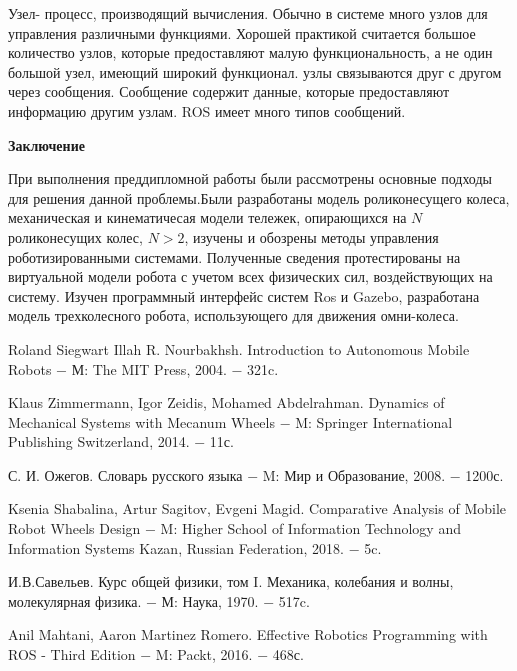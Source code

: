 \documentclass[oneside,final,14pt]{extreport}
\begin{document}
 Узел- процесс, производящий вычисления. Обычно в системе много узлов для управления различными функциями. Хорошей практикой считается большое количество узлов, которые предоставляют малую функциональность, а не один большой узел, имеющий широкий функционал. узлы связываются друг с другом через сообщения. Сообщение содержит данные, которые предоставляют информацию другим узлам. ROS имеет много типов сообщений.


\newpage
\begin{center}
\bfseries Заключение
\end{center}

При выполнения преддипломной работы были рассмотрены основные подходы для решения данной проблемы.Были разработаны модель роликонесущего колеса, механическая и кинематичесая модели тележек, опирающихся на $N$ роликонесущих колес, $N>2$, изучены и обозрены методы управления роботизированными системами. Полученные сведения протестированы на виртуальной модели робота с учетом всех физических сил, воздействующих на систему. Изучен программный интерфейс систем Ros и Gazebo, разработана модель трехколесного робота, использующего для движения омни-колеса.

\newpage
\begin{thebibliography}{0}

Roland Siegwart
Illah R. Nourbakhsh.
Introduction to Autonomous Mobile Robots
$-$ М: The MIT Press, 2004. $-$ 321c.

Klaus Zimmermann, Igor Zeidis, Mohamed Abdelrahman.
Dynamics of Mechanical Systems
with Mecanum Wheels
$-$ M:  Springer International Publishing Switzerland, 2014. $-$ 11с.

С. И. Ожегов.
Словарь русского языка
$-$ M: Мир и Образование, 2008. $-$ 1200с.


Ksenia Shabalina, Artur Sagitov, Evgeni Magid.
Comparative Analysis of Mobile Robot Wheels
Design
$-$ M: Higher School of Information Technology and Information Systems
Kazan, Russian Federation, 2018. $-$ 5c.

И.В.Савельев.
Курс общей физики, том I.
Механика, колебания и волны, молекулярная физика.
$-$ М: Наука, 1970. $-$ 517c.

Anil Mahtani, Aaron Martinez Romero.
Effective Robotics Programming with ROS - Third Edition
$-$ M: Packt, 2016. $-$ 468с.

\end{thebibliography}
\end{document}
